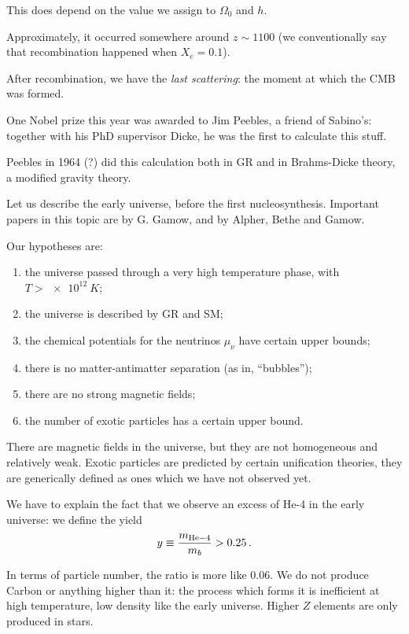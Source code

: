 \documentclass[main.tex]{subfiles}
\begin{document}
This does depend on the value we assign to \(\Omega_0\) and \(h\).

Approximately, it occurred somewhere around \(z \sim 1100\) (we conventionally say that recombination happened when \(X_e = 0.1\)).

After recombination, we have the \emph{last scattering}: the moment at which the CMB was formed.

One Nobel prize this year was awarded to Jim Peebles, a friend of Sabino's: together with his PhD supervisor Dicke, he was the first to calculate this stuff.

Peebles in 1964 (?) did this calculation both in GR and in Brahms-Dicke theory, a modified gravity theory.

Let us describe the early universe, before the first nucleosynthesis.
Important papers in this topic are by G. Gamow, and by Alpher, Bethe and Gamow.

Our hypotheses are:
%
\begin{enumerate}
    \item the universe passed through a very high temperature phase, with \(T > \SI{e12}{K}\);
    \item the universe is described by GR and SM;
    \item the chemical potentials for the neutrinos \(\mu_{\nu }\) have certain upper bounds; 
    \item there is no matter-antimatter separation (as in, ``bubbles'');
    \item there are no strong magnetic fields;
    \item the number of exotic particles has a certain upper bound.
\end{enumerate}

There are magnetic fields in the universe, but they are not homogeneous and relatively weak.
Exotic particles are predicted by certain unification theories, they are generically defined as ones which we have not observed yet.

We have to explain the fact that we observe an excess of He-4 in the early universe: we define the yield 
%
\begin{align}
  y \equiv \frac{m_{\ce{He-4}}}{m_b} > \num{.25}
\,.
\end{align}

In terms of particle number, the ratio is more like \num{.06}. 
We do not produce Carbon or anything higher than it: the process which forms it is inefficient at high temperature, low density like the early universe.
Higher \(Z\) elements are only produced in stars.
\end{document}
